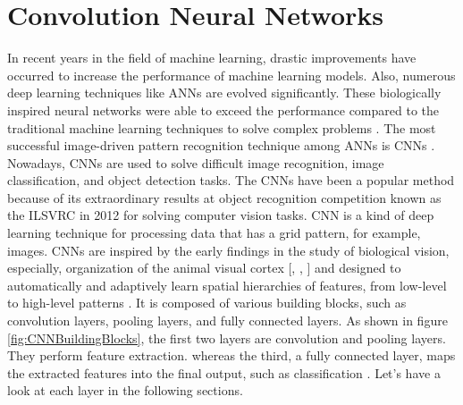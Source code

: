 \section{Convolution Neural Networks}\label{CNNs}


In recent years in the field of machine learning, drastic improvements have occurred to increase the performance of machine learning models. Also, numerous deep learning techniques like \acp{ANN} are evolved significantly. These biologically inspired neural networks were able to exceed the performance compared to the traditional machine learning techniques to solve complex problems \cite{oshea2015introduction}. The most successful image-driven pattern recognition technique among \acp{ANN} is \acp{CNN} \cite{oshea2015introduction}. Nowadays, \acp{CNN} are used to solve difficult image recognition, image classification, and object detection tasks. The \acp{CNN} have been a popular method because of its extraordinary results at object recognition competition known as the \ac{ILSVRC} in 2012 for solving computer vision tasks. \ac{CNN} is a kind of deep learning technique for processing data that has a grid pattern, for example, images. \acp{CNN} are inspired by the early findings in the study of biological vision, especially, organization of the animal visual cortex [\cite{Hubel.1968}, \cite{Fukushima.1980}, \cite{10.5555/3153997}] and designed to automatically and adaptively learn spatial hierarchies of features, from low-level to high-level patterns \cite{10.5555/3153997}. It is composed of various building blocks, such as convolution layers, pooling layers, and fully connected layers. As shown in figure \ref{fig:CNNBuildingBlocks}, the first two layers are convolution and pooling layers. They perform feature extraction. whereas the third, a fully connected layer, maps the extracted features into the final output, such as classification \cite{articleCNNs}. Let's have a look at each layer in the following sections.




